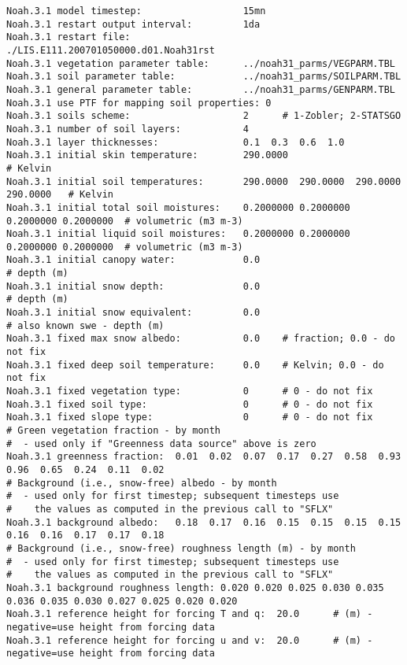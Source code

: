  \begin{Verbatim}[frame=single]
Noah.3.1 model timestep:                  15mn
Noah.3.1 restart output interval:         1da
Noah.3.1 restart file:                    ./LIS.E111.200701050000.d01.Noah31rst
Noah.3.1 vegetation parameter table:      ../noah31_parms/VEGPARM.TBL
Noah.3.1 soil parameter table:            ../noah31_parms/SOILPARM.TBL
Noah.3.1 general parameter table:         ../noah31_parms/GENPARM.TBL
Noah.3.1 use PTF for mapping soil properties: 0
Noah.3.1 soils scheme:                    2      # 1-Zobler; 2-STATSGO
Noah.3.1 number of soil layers:           4
Noah.3.1 layer thicknesses:               0.1  0.3  0.6  1.0
Noah.3.1 initial skin temperature:        290.0000                                 # Kelvin
Noah.3.1 initial soil temperatures:       290.0000  290.0000  290.0000  290.0000   # Kelvin
Noah.3.1 initial total soil moistures:    0.2000000 0.2000000 0.2000000 0.2000000  # volumetric (m3 m-3)
Noah.3.1 initial liquid soil moistures:   0.2000000 0.2000000 0.2000000 0.2000000  # volumetric (m3 m-3)
Noah.3.1 initial canopy water:            0.0                                      # depth (m)
Noah.3.1 initial snow depth:              0.0                                      # depth (m)
Noah.3.1 initial snow equivalent:         0.0                                      # also known swe - depth (m)
Noah.3.1 fixed max snow albedo:           0.0    # fraction; 0.0 - do not fix
Noah.3.1 fixed deep soil temperature:     0.0    # Kelvin; 0.0 - do not fix
Noah.3.1 fixed vegetation type:           0      # 0 - do not fix
Noah.3.1 fixed soil type:                 0      # 0 - do not fix
Noah.3.1 fixed slope type:                0      # 0 - do not fix
# Green vegetation fraction - by month
#  - used only if "Greenness data source" above is zero
Noah.3.1 greenness fraction:  0.01  0.02  0.07  0.17  0.27  0.58  0.93  0.96  0.65  0.24  0.11  0.02
# Background (i.e., snow-free) albedo - by month
#  - used only for first timestep; subsequent timesteps use
#    the values as computed in the previous call to "SFLX"
Noah.3.1 background albedo:   0.18  0.17  0.16  0.15  0.15  0.15  0.15  0.16  0.16  0.17  0.17  0.18
# Background (i.e., snow-free) roughness length (m) - by month
#  - used only for first timestep; subsequent timesteps use
#    the values as computed in the previous call to "SFLX"
Noah.3.1 background roughness length: 0.020 0.020 0.025 0.030 0.035 0.036 0.035 0.030 0.027 0.025 0.020 0.020
Noah.3.1 reference height for forcing T and q:  20.0      # (m) - negative=use height from forcing data
Noah.3.1 reference height for forcing u and v:  20.0      # (m) - negative=use height from forcing data
 \end{Verbatim}
 

